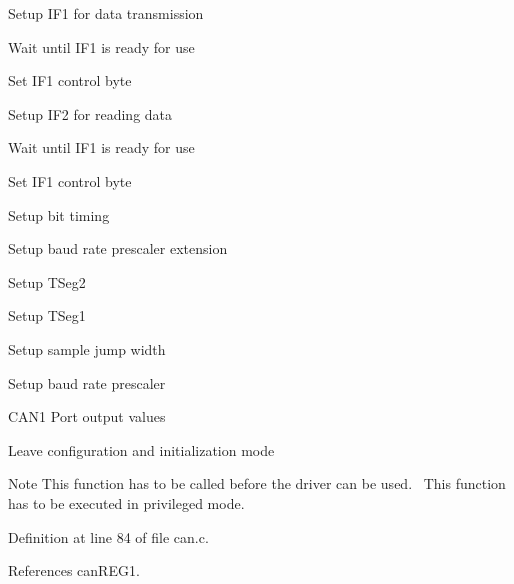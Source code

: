 \begin{DoxyItemize}
\item Setup I\+F1 for data transmission
\begin{DoxyItemize}
\item Wait until I\+F1 is ready for use
\item Set I\+F1 control byte
\end{DoxyItemize}
\item Setup I\+F2 for reading data
\begin{DoxyItemize}
\item Wait until I\+F1 is ready for use
\item Set I\+F1 control byte
\end{DoxyItemize}
\item Setup bit timing
\begin{DoxyItemize}
\item Setup baud rate prescaler extension
\item Setup T\+Seg2
\item Setup T\+Seg1
\item Setup sample jump width
\item Setup baud rate prescaler
\end{DoxyItemize}
\item C\+A\+N1 Port output values ~\newline
~\newline

\item Leave configuration and initialization mode ~\newline
 \begin{DoxyNote}{Note}
This function has to be called before the driver can be used.~\newline
 This function has to be executed in privileged mode.~\newline
 
\end{DoxyNote}

\end{DoxyItemize}

Definition at line 84 of file can.\+c.



References can\+R\+E\+G1.


